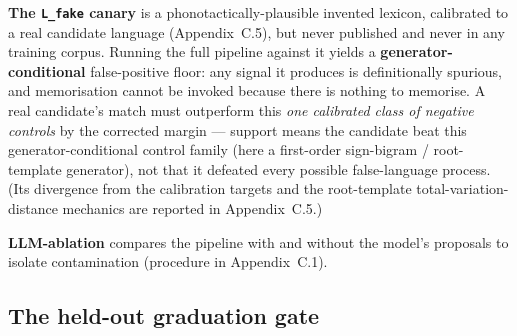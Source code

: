 \textbf{The \texttt{L\_fake} canary} is a phonotactically-plausible
invented lexicon, calibrated to a real candidate language
(Appendix~C.5), but never
published and never in any training corpus. Running the full pipeline
against it yields a \textbf{generator-conditional} false-positive floor:
any signal it produces is definitionally spurious, and memorisation cannot
be invoked because there is nothing to memorise. A real candidate's match
must outperform this \emph{one calibrated class of negative controls} by
the corrected margin --- support means the candidate beat this
generator-conditional control family (here a first-order sign-bigram /
root-template generator), not that it defeated every possible false-language
process. (Its divergence from the calibration targets and the root-template
total-variation-distance mechanics are reported in Appendix~C.5.)

\textbf{LLM-ablation} compares the pipeline with and without the model's
proposals to isolate contamination (procedure in Appendix~C.1).

\subsection{The held-out graduation gate}

